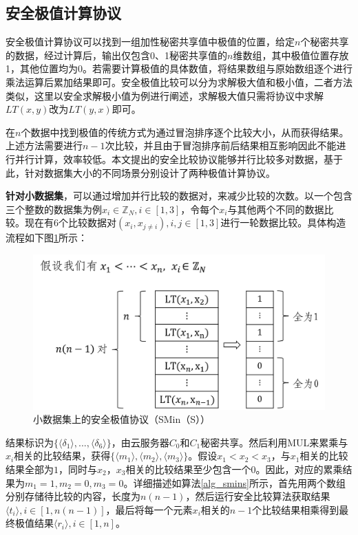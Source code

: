 \subsection{安全极值计算协议}
\label{s3-secureminimum}
安全极值计算协议可以找到一组加性秘密共享值中极值的位置，给定$ n $个秘密共享的数据，经过计算后，输出仅包含0、1秘密共享值的$n$维数组，其中极值位置存放1，其他位置均为0。若需要计算极值的具体数值，将结果数组与原始数组逐个进行乘法运算后累加结果即可。安全极值比较可以分为求解极大值和极小值，二者方法类似，这里以安全求解极小值为例进行阐述，求解极大值只需将协议中求解$LT(x,y)$改为$LT(y,x)$即可。

在$n$个数据中找到极值的传统方式为通过冒泡排序逐个比较大小，从而获得结果。上述方法需要进行$n-1$次比较，并且由于冒泡排序前后结果相互影响因此不能进行并行计算，效率较低。本文提出的安全比较协议能够并行比较多对数据，基于此，针对数据集大小的不同场景分别设计了两种极值计算协议。

\textbf{针对小数据集}，可以通过增加并行比较的数据对，来减少比较的次数。以一个包含三个整数的数据集为例$x_i \in \mathbb{Z}_N, i\in[1,3]$，令每个$x_i$与其他两个不同的数据比较。现在有6个比较数据对$(x_i, x_{j\neq i}), i,j \in [1,3] $进行一轮数据比较。具体构造流程如下图\ref{smins}所示：

\begin{figure}[htbp]
	\centering
	\includegraphics[scale=0.6]{img/fig4.png}%
	\caption{小数据集上的安全极值协议（SMin（S））}
	\label{smins}
\end{figure}

结果标识为$\{\langle\delta_1\rangle,...,\langle\delta_6\rangle\}$，由云服务器$C_0$和$C_1$秘密共享。然后利用MUL来累乘与$x_i$相关的比较结果，获得$\{\langle m_1 \rangle,\langle m_2 \rangle,\langle m_3\rangle\}$。假设$x_1<x_2<x_3$，与$x_1$相关的比较结果全部为$1$，同时与$x_2$，$x_3$相关的比较结果至少包含一个$0$。因此，对应的累乘结果为$m_1=1, m_2=0, m_3=0$。详细描述如算法\ref{alg_smins}所示，首先用两个数组分别存储待比较的内容，长度为$ n(n-1) $，然后运行安全比较算法获取结果$ \langle t_i \rangle, i \in [1,n(n-1)] $，最后将每一个元素$ x_i $相关的$ n-1 $个比较结果相乘得到最终极值结果$ \langle r_i \rangle, i\in[1,n]$。

